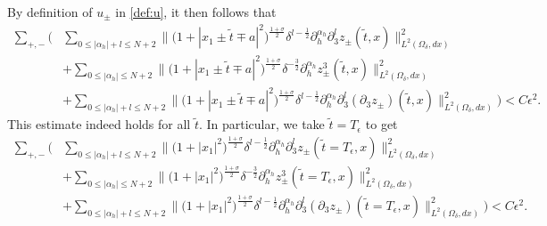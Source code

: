 \documentclass[10pt,reqno]{amsart}
\numberwithin{equation}{section}
\begin{document}
By definition of $u_\pm$ in \eqref{def:u}, it then follows that 
\begin{align*} 
	\sum_{+,-}\bigg(&\sum_{0\leqslant|\alpha_h|+l\leqslant N+2}\Big\|\big(1+|x_1\pm \widetilde{t}\mp a|^2\big)^{\frac{1+\sigma}{2}}\delta^{l-\frac{1}{2}}\partial_h^{\alpha_h}\partial_3^lz_{\pm}(\widetilde{t},x)\Big\|_{L^2(\Omega_{\delta},dx)}^2\\
	&+\sum_{0\leqslant|\alpha_h|\leqslant N+2}\Big\|\big(1+|x_1\pm \widetilde{t}\mp  a|^2\big)^{\frac{1+\sigma}{2}}\delta^{-\frac{3}{2}}\partial_h^{\alpha_h}z^3_{\pm}(\widetilde{t},x)\Big\|_{L^2(\Omega_{\delta},dx)}^2\\
	&+\sum_{0\leqslant|\alpha_h|+l\leqslant N+2}\Big\|\big(1+|x_1\pm \widetilde{t}\mp a|^2\big)^{\frac{1+\sigma}{2}}\delta^{l-\frac{1}{2}}\partial_h^{\alpha_h}\partial_3^l(\partial_3z_{\pm})(\widetilde{t},x)\Big\|_{L^2(\Omega_{\delta},dx)}^2\bigg)<C\epsilon^2.
\end{align*}
This estimate indeed holds for all $\widetilde{t}$. In particular, we take $\widetilde{t}=T_\epsilon$ to get 
\begin{align*} 
	\sum_{+,-}\bigg(&\sum_{0\leqslant|\alpha_h|+l\leqslant N+2}\Big\|\big(1+|x_1|^2\big)^{\frac{1+\sigma}{2}}\delta^{l-\frac{1}{2}}\partial_h^{\alpha_h}\partial_3^lz_{\pm}(\widetilde{t}=T_\epsilon,x)\Big\|_{L^2(\Omega_{\delta},dx)}^2\\
	&+\sum_{0\leqslant|\alpha_h|\leqslant N+2}\Big\|\big(1+|x_1|^2\big)^{\frac{1+\sigma}{2}}\delta^{-\frac{3}{2}}\partial_h^{\alpha_h}z^3_{\pm}(\widetilde{t}=T_\epsilon,x)\Big\|_{L^2(\Omega_{\delta},dx)}^2\\
	&+\sum_{0\leqslant|\alpha_h|+l\leqslant N+2}\Big\|\big(1+|x_1|^2\big)^{\frac{1+\sigma}{2}}\delta^{l-\frac{1}{2}}\partial_h^{\alpha_h}\partial_3^l(\partial_3z_{\pm})(\widetilde{t}=T_\epsilon,x)\Big\|_{L^2(\Omega_{\delta},dx)}^2\bigg)<C\epsilon^2.
\end{align*}
\end{document}
